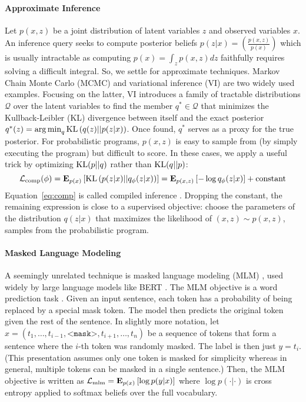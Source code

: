 \paragraph{Approximate Inference} 
Let $p(x, z)$ be a joint distribution of latent variables $z$ and observed variables $x$. An inference query seeks to compute posterior beliefs $p(z|x) = \left(\frac{p(x,z)}{p(x)}\right)$ which is usually intractable as computing $p(x) = \int_z p(x,z) dz$ faithfully requires solving a difficult integral.
So, we settle for approximate techniques. Markov Chain Monte Carlo (MCMC) \cite{hastings1970monte,gelfand1990sampling} and variational inference (VI) \cite{jordan1999introduction,wainwright2008graphical,blei2017variational} are two widely used examples. Focusing on the latter, VI introduces a family of tractable distributions $\mathcal{Q}$ over the latent variables to find the member $q^* \in \mathcal{Q}$ that minimizes the Kullback-Leibler (KL) divergence between itself and the exact posterior $q^*(z) = \argmin_q \textup{KL}\left(q(z) || p(z|x)\right)$. Once found, $q^*$ serves as a proxy for the true posterior.
For probabilistic programs, $p(x,z)$ is easy to sample from (by simply executing the program) but difficult to score.
In these cases, we apply a useful trick by optimizing $\textup{KL}(p||q)$ rather than $\textup{KL}(q||p)$:
\begin{equation}
\mathcal{L}_{\textup{comp}}(\phi) = \mathbf{E}_{p(x)}\left[ \textup{KL}\left( p(z|x) || q_\phi(z|x) \right) \right] = \mathbf{E}_{p(x,z)} \left[-\log q_\phi(z|x) \right] + \textup{constant}
\label{eq:comp}
\end{equation}
Equation~\ref{eq:comp} is called compiled inference \cite{le2017inference}. Dropping the constant, the remaining expression is close to a supervised objective: choose the parameters of the distribution $q(z|x)$ that maximizes the likelihood of $(x,z) \sim p(x,z)$, samples from the probabilistic program.

\paragraph{Masked Language Modeling}
A seemingly unrelated technique is masked language modeling (MLM) \cite{devlin2018bert}, used widely by large language models like BERT \cite{devlin2018bert}. The MLM objective is a word prediction task \cite{taylor1953cloze}. Given an input sentence, each token has a probability of being replaced by a special mask token. The model then predicts the original token given the rest of the sentence.
In slightly more notation, let $x = (t_1, \ldots, t_{i-1}, \texttt{<mask>}, t_{i+1}, \ldots, t_n)$ be a sequence of tokens that form a sentence where the $i$-th token was randomly masked. The label is then just $y = t_i$. (This presentation assumes only one token is masked for simplicity whereas in general, multiple tokens can be masked in a single sentence.) Then, the MLM objective is written as $\mathcal{L}_{\textup{mlm}} = \mathbf{E}_{p(x)}\left[ \log p(y|x) \right]$ where $\log p(\cdot|\cdot)$ is cross entropy applied to softmax beliefs over the full vocabulary.

